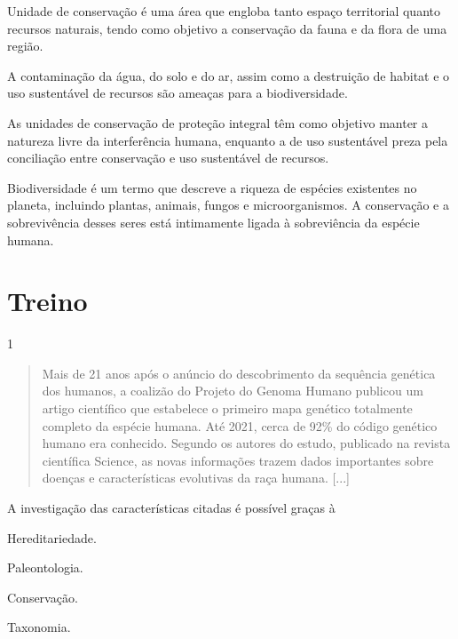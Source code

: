 \begin{boxlist}
 Unidade de conservação é uma área que engloba tanto espaço
territorial quanto recursos naturais, tendo como objetivo a conservação
da fauna e da flora de uma região.

 A contaminação da água, do solo e do ar, assim como a destruição de
habitat e o uso sustentável de recursos são ameaças para a
biodiversidade. 

 As unidades de conservação de proteção integral têm como objetivo
manter a natureza livre da interferência humana, enquanto a de uso
sustentável preza pela conciliação entre conservação e uso sustentável
de recursos.

 Biodiversidade é um termo que descreve a riqueza de espécies
existentes no planeta, incluindo plantas, animais, fungos e
microorganismos. A conservação e a sobrevivência desses seres está
intimamente ligada à sobreviência da espécie humana.
\end{boxlist}


\section{Treino}

\num{1}

\begin{quote}
Mais de 21 anos após o anúncio do descobrimento da sequência genética
  dos humanos, a coalizão do Projeto do Genoma Humano publicou um artigo
  científico que estabelece o primeiro mapa genético totalmente completo
  da espécie humana. 
  Até 2021, cerca de 92\% do código genético humano
  era conhecido. Segundo os autores do estudo, publicado na revista
  científica Science, as novas informações trazem dados importantes
  sobre doenças e características evolutivas da raça humana. [...]

\end{quote}

A investigação das características citadas é possível graças à

\begin{escolha}
\item
  Hereditariedade.
\item
  Paleontologia.
\item
  Conservação.
\item
  Taxonomia.
\end{escolha}

